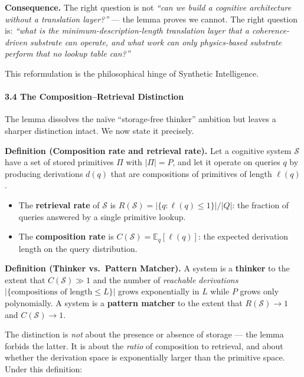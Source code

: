 \documentclass[
  11pt,
  a4paper,
]{article}
\providecommand{\tightlist}{%
  \setlength{\itemsep}{0pt}\setlength{\parskip}{0pt}}
\begin{document}
\textbf{Consequence.} The right question is not \emph{``can we build a
cognitive architecture without a translation layer?''} --- the lemma
proves we cannot. The right question is: \emph{``what is the
minimum-description-length translation layer that a coherence-driven
substrate can operate, and what work can only physics-based substrate
perform that no lookup table can?''}

This reformulation is the philosophical hinge of Synthetic Intelligence.

\paragraph{3.4 The Composition--Retrieval
Distinction}\label{the-compositionretrieval-distinction}

The lemma dissolves the naïve ``storage-free thinker'' ambition but
leaves a sharper distinction intact. We now state it precisely.

\textbf{Definition (Composition rate and retrieval rate).} Let a
cognitive system \(\mathcal{S}\) have a set of stored primitives \(\Pi\)
with \(|\Pi| = P\), and let it operate on queries \(q\) by producing
derivations \(d(q)\) that are compositions of primitives of length
\(\ell(q)\).

\begin{itemize}
\tightlist
\item
  The \textbf{retrieval rate} of \(\mathcal{S}\) is
  \(R(\mathcal{S}) = |\{q : \ell(q) \leq 1\}| / |Q|\): the fraction of
  queries answered by a single primitive lookup.
\item
  The \textbf{composition rate} is
  \(C(\mathcal{S}) = \mathbb{E}_q[\ell(q)]\): the expected derivation
  length on the query distribution.
\end{itemize}

\textbf{Definition (Thinker vs.~Pattern Matcher).} A system is a
\textbf{thinker} to the extent that \(C(\mathcal{S}) \gg 1\) and the
number of \emph{reachable derivations}
\(|\{\text{compositions of length} \leq L\}|\) grows exponentially in
\(L\) while \(P\) grows only polynomially. A system is a \textbf{pattern
matcher} to the extent that \(R(\mathcal{S}) \to 1\) and
\(C(\mathcal{S}) \to 1\).

The distinction is \emph{not} about the presence or absence of storage
--- the lemma forbids the latter. It is about the \emph{ratio} of
composition to retrieval, and about whether the derivation space is
exponentially larger than the primitive space. Under this definition:
\end{document}
